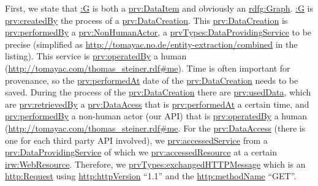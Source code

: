 \documentclass[conference]{IEEEtran}
\begin{document}
First, we state that \url{:G} is both a \url{prv:DataItem} and obviously an \url{rdfg:Graph}. \url{:G} is \url{prv:createdBy} the process of a \url{prv:DataCreation}. This \url{prv:DataCreation} is \url{prv:performedBy} a \url{prv:NonHumanActor}, a \url{prvTypes:DataProvidingService} to be precise (simplified as \url{http://tomayac.no.de/entity-extraction/combined} in the listing). This service is \url{prv:operatedBy} a human (\url{http://tomayac.com/thomas_steiner.rdf#me}). Time is often important for provenance, so the \url{prv:performedAt} date of the \url{prv:DataCreation} needs to be saved. During the process of the \url{prv:DataCreation} there are \url{prv:usedData}, which are \url{prv:retrievedBy} a \url{prv:DataAcess} that is \url{prv:performedAt} a certain time, and \url{prv:performedBy} a non-human actor (our API) that is \url{prv:operatedBy} a human (\url{http://tomayac.com/thomas_steiner.rdf#me}. For the \url{prv:DataAccess} (there is one for each third party API involved), we \url{prv:accessedService} from a \url{prv:DataProvidingService} of which we \url{prv:accessedResource} at a certain \url{irw:WebResource}. Therefore, we \url{prvTypes:exchangedHTTPMessage} which is an \url{http:Request} using \url{http:httpVersion} ``1.1'' and the \url{http:methodName} ``GET''.
\end{document}
